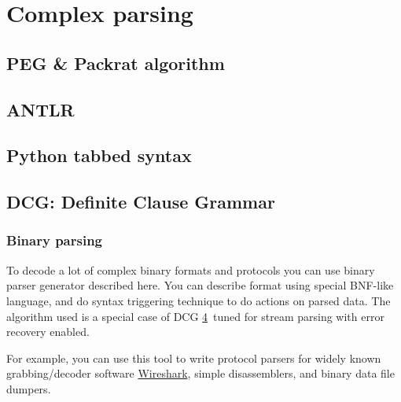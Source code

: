 \part{Complex parsing}

\chapter{PEG \& Packrat algorithm}

\chapter{ANTLR}

\chapter{Python tabbed syntax}

\chapter{DCG: Definite Clause Grammar}\label{DCG}\clearpage

\section{Binary parsing}

To decode a lot of complex binary formats and protocols you can use binary
parser generator described here. You can describe format using special BNF-like
language, and do syntax triggering technique to do actions on parsed data.
The algorithm used is a special case of DCG \ref{DCG}\ tuned for stream parsing
with error recovery enabled.

For example, you can use this tool to write protocol parsers for widely known
grabbing/decoder software \href{http://www.wireshark.org/}{Wireshark}, 
simple disassemblers, and binary data file dumpers.
